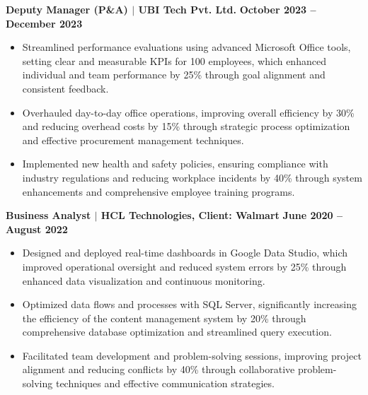 \documentclass{article}
\begin{document}
\noindent \textbf{Deputy Manager (P\&A) $\mid$ UBI Tech Pvt. Ltd.} \hfill \textbf{October 2023 – December 2023}
\begin{itemize}[noitemsep,nolistsep,leftmargin=*]
\item {\small Streamlined performance evaluations using advanced Microsoft Office tools, setting clear and measurable KPIs for 100 employees, which enhanced individual and team performance by 25\% through goal alignment and consistent feedback.}
\item {\small Overhauled day-to-day office operations, improving overall efficiency by 30\% and reducing overhead costs by 15\% through strategic process optimization and effective procurement management techniques.}
\item {\small Implemented new health and safety policies, ensuring compliance with industry regulations and reducing workplace incidents by 40\% through system enhancements and comprehensive employee training programs.}
\end{itemize}

\noindent \textbf{Business Analyst $\mid$ HCL Technologies, Client: Walmart} \hfill \textbf{June 2020 – August 2022}
\begin{itemize}[noitemsep,nolistsep,leftmargin=*]
\item {\small Designed and deployed real-time dashboards in Google Data Studio, which improved operational oversight and reduced system errors by 25\% through enhanced data visualization and continuous monitoring.}
\item {\small Optimized data flows and processes with SQL Server, significantly increasing the efficiency of the content management system by 20\% through comprehensive database optimization and streamlined query execution.}
\item {\small Facilitated team development and problem-solving sessions, improving project alignment and reducing conflicts by 40\% through collaborative problem-solving techniques and effective communication strategies.}
\end{itemize}
\vspace{1mm}
\end{document}
